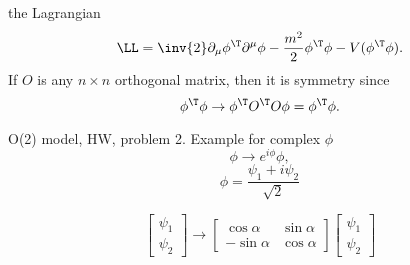 the Lagrangian
\begin{dmath}\label{eqn:qftLecture6:960}
\LL = \inv{2} \partial_\mu \phi^\T \partial^\mu \phi - \frac{m^2}{2} \phi^\T \phi - V(\phi^\T \phi).
\end{dmath}
If \( O \) is any \( n \times n \) orthogonal matrix, then it is symmetry since
\begin{dmath}\label{eqn:qftLecture6:980}
\phi^\T \phi \rightarrow \phi^\T O^\T O \phi = \phi^\T \phi.
\end{dmath}

O(2) model, HW, problem 2.  Example for complex \( \phi \)
\begin{dmath}\label{eqn:qftLecture6:1000}
\phi \rightarrow e^{i \phi} \phi,
\end{dmath}
\begin{dmath}\label{eqn:qftLecture6:1020}
\phi = \frac{\psi_1 + i \psi_2}{\sqrt{2}}
\end{dmath}

\begin{dmath}\label{eqn:qftLecture6:1040}
\begin{bmatrix}
\psi_1 \\
\psi_2
\end{bmatrix}
\rightarrow
\begin{bmatrix}
\cos\alpha & \sin\alpha \\
-\sin\alpha & \cos\alpha
\end{bmatrix}
\begin{bmatrix}
\psi_1 \\
\psi_2
\end{bmatrix}
\end{dmath}

